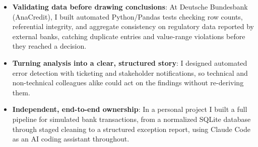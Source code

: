 \documentclass[]{cover}
\begin{document}


\currentdate{\today}



{\raggedright{}\fontsize{11pt}{13pt}\selectfont
\begin{itemize}
    \item \textbf{Validating data before drawing conclusions}: At Deutsche Bundesbank (AnaCredit), I built automated Python/Pandas tests checking row counts, referential integrity, and aggregate consistency on regulatory data reported by external banks, catching duplicate entries and value-range violations before they reached a decision.
    \item \textbf{Turning analysis into a clear, structured story}: I designed automated error detection with ticketing and stakeholder notifications, so technical and non-technical colleagues alike could act on the findings without re-deriving them.
    \item \textbf{Independent, end-to-end ownership}: In a personal project I built a full pipeline for simulated bank transactions, from a normalized SQLite database through staged cleaning to a structured exception report, using Claude Code as an AI coding assistant throughout.
\end{itemize}\par}
\vspace{6pt}
\end{document}
